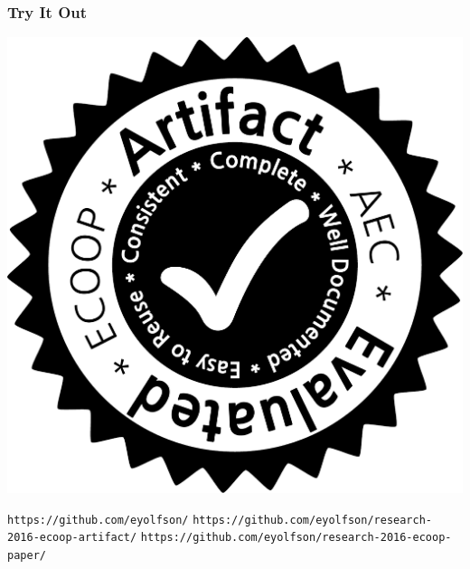\documentclass[aspectratio=169]{beamer}
\begin{document}
  \begin{frame}
    \frametitle{Try It Out}

    \begin{center}
      \includegraphics[scale=0.1]{aec-badge-ecoop}

      \vspace{0.25em}
      \texttt{\huge https://github.com/eyolfson/}
      \texttt{https://github.com/eyolfson/research-2016-ecoop-artifact/}
      \texttt{https://github.com/eyolfson/research-2016-ecoop-paper/}
    \end{center}

  \end{frame}
\end{document}
